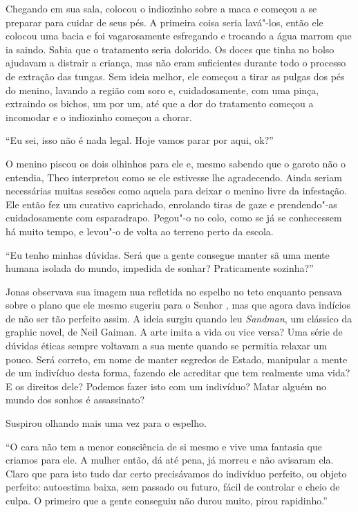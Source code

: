 Chegando em sua sala, colocou o indiozinho sobre a maca e começou a se
preparar para cuidar de seus pés. A primeira coisa seria lavá"-los, então
ele colocou uma bacia e foi vagarosamente esfregando e trocando a água
marrom que ia saindo. Sabia que o tratamento seria dolorido. Os doces
que tinha no bolso ajudavam a distrair a criança, mas não eram
suficientes durante todo o processo de extração das tungas. Sem ideia
melhor, ele começou a tirar as pulgas dos pés do menino, lavando a
região com soro e, cuidadosamente, com uma pinça, extraindo os bichos,
um por um, até que a dor do tratamento começou a incomodar e o
indiozinho começou a chorar.

``Eu sei, isso não é nada legal. Hoje vamos parar por aqui, ok?''

O menino piscou os dois olhinhos para ele e, mesmo sabendo que o garoto
não o entendia, Theo interpretou como se ele estivesse lhe agradecendo.
Ainda seriam necessárias muitas sessões como aquela para deixar o menino
livre da infestação. Ele então fez um curativo caprichado, enrolando
tiras de gaze e prendendo"-as cuidadosamente com esparadrapo. Pegou"-o no
colo, como se já se conhecessem há muito tempo, e levou"-o de volta ao
terreno perto da escola.

\asterisc


``Eu tenho minhas dúvidas. Será que a gente consegue manter sã uma mente
humana isolada do mundo, impedida de sonhar? Praticamente sozinha?''

Jonas observava sua imagem nua refletida no espelho no teto enquanto
pensava sobre o plano que ele mesmo sugeriu para o Senhor , mas que
agora dava indícios de não ser tão perfeito assim. A ideia surgiu
quando leu \emph{Sandman}, um clássico da graphic novel, de Neil Gaiman. A
arte imita a vida ou vice versa? Uma série de dúvidas éticas sempre
voltavam a sua mente quando se permitia relaxar um pouco. Será correto,
em nome de manter segredos de Estado, manipular a mente de um indivíduo
desta forma, fazendo ele acreditar que tem realmente uma vida? E os
direitos dele? Podemos fazer isto com um indivíduo? Matar alguém no
mundo dos sonhos é assassinato?

Suspirou olhando mais uma vez para o espelho.

``O cara não tem a menor consciência de si mesmo e vive uma fantasia que
criamos para ele. A mulher então, dá até pena, já morreu e não avisaram
ela. Claro que para isto tudo dar certo precisávamos do indivíduo
perfeito, ou objeto perfeito: autoestima baixa, sem passado ou futuro,
fácil de controlar e cheio de culpa. O primeiro que a gente conseguiu
não durou muito, pirou rapidinho.''

